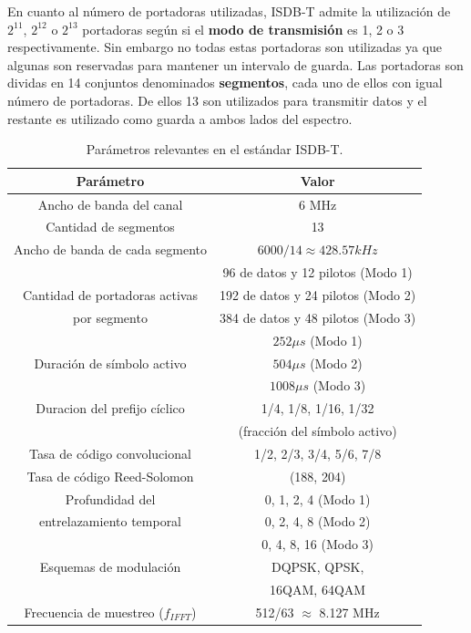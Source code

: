 \documentclass[journal,comsoc]{IEEEtran}
\begin{document}
En cuanto al número de portadoras utilizadas, ISDB-T admite la utilización de $2^{11}$, $2^{12}$ o $2^{13}$ portadoras según si el \textbf{modo de transmisión} es 1, 2 o 3 respectivamente. Sin embargo no todas estas portadoras son utilizadas ya que algunas son reservadas para mantener un intervalo de guarda. Las portadoras son dividas en 14 conjuntos denominados \textbf{segmentos}, cada uno de ellos con igual número de portadoras. De ellos 13 son utilizados para transmitir datos y el restante es utilizado como guarda a ambos lados del espectro.
\begin{table}[h!]
\centering
\begin{tabular}{|c|c|}
\hline
\textbf{Parámetro} 				& \textbf{Valor}\\
\hline
Ancho de banda del canal 		& 6 MHz\\
\hline
Cantidad de segmentos 			& 13 \\
\hline
Ancho de banda de cada segmento & $6000/14 \approx 428.57kHz$ \\
\hline
  											& 96 de datos y 12 pilotos (Modo 1) \\
Cantidad de portadoras activas  & 192 de datos y 24 pilotos (Modo 2) \\
 		por segmento									& 384 de datos y 48 pilotos (Modo 3)\\
\hline
 								& $252 \mu s$ (Modo 1)\\
Duración de símbolo activo 		& $504 \mu s$ (Modo 2) \\
								& $1008 \mu s$ (Modo 3) \\
\hline
Duracion del prefijo cíclico 	& 1/4, 1/8, 1/16, 1/32 \\
 								& (fracción del símbolo activo)\\
\hline
Tasa de código convolucional 	& 1/2, 2/3, 3/4, 5/6, 7/8\\
\hline
Tasa de código Reed-Solomon 	& (188, 204) \\
\hline
 	Profundidad del			& 0, 1, 2, 4 (Modo 1) \\
entrelazamiento temporal & 0, 2, 4, 8 (Modo 2) \\
		 & 0, 4, 8, 16 (Modo 3)\\
\hline
Esquemas de modulación & DQPSK, QPSK,\\
 & 16QAM, 64QAM\\
 \hline
 Frecuencia de muestreo ($f_{IFFT}$) & 512/63 $\approx$ 8.127 MHz\\
 \hline
\end{tabular}
\caption{\label{parametros_ISDBT} Par\'ametros relevantes en el est\'andar ISDB-T.}
\end{table}
\end{document}
